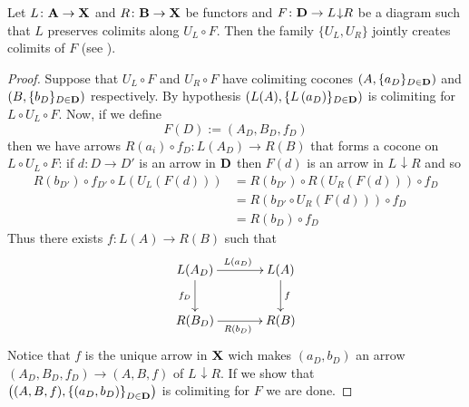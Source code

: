 \documentclass[runningheads,envcountsect]{lipics-v2021}
\def\B{\textbf {\textup{B}}}
\def\D{\textbf {\textup{D}}}
\def\X{\textbf {\textup{X}}}
\def\A{\textbf {\textup{A}}}
\newcommand{\comma}[2]{#1\hspace{1pt} {\downarrow}#2}
\begin{document}
\begin{lemma}\label{colim}
	Let $L\colon \A\to \X$ and $R\colon \B\to \X$ be functors and $F\colon \D\to\comma{L}{R}$ be a diagram such that $L$ preserves colimits along $U_L\circ F$. Then the family $\{U_L, U_R\}$ jointly creates colimits of $F$ (see \cite{castelnovo2023thesis,castelnovo2022newcriterionmathcalmmathcalnadhesivity}).
\end{lemma}
\begin{proof}
	Suppose that $U_L\circ F$ and $U_R\circ F$ have colimiting cocones  $\left(A, \{a_D\}_{D\in \D}\right)$ and $\left(B, \{b_D\}_{D\in \D}\right)$ respectively. By hypothesis $\left(L(A), \{L\left(a_D\right)\}_{D\in \D}\right)$ is colimiting for $L\circ U_L\circ F$. Now, if we define
	\[F(D):=(A_D, B_D, f_D)\]
	then we have arrows $R(a_i)\circ f_D\colon L(A_D)\to R(B)$ that forms a cocone on $L\circ U_L\circ F$: if $d\colon D\to D'$ is an arrow in $\D$ then $F(d)$ is an arrow in $\comma{L}{R}$ and so
	\begin{align*}
		R\left(b_{D'}\right)\circ f_{D'}\circ L(U_L(F(d)))&=R\left(b_{D'}\right)\circ R\left(U_R\left(F(d)\right)\right)\circ f_D\\&=R\left(b_{D'}\circ U_R\left(F(d)\right)\right)\circ f_D\\&=R\left(b_D\right)\circ f_D
	\end{align*}
	Thus there exists $f\colon L(A)\rightarrow R(B)$ such that
	\[\xymatrix@C=35pt{ L(A_D) \ar[r]^{L(a_D)} \ar[d]_{f_D}& L(A) \ar[d]^{f}\\ R(B_D) \ar[r]_{R(b_D)} &R(B)}\]
	Notice that $f$ is the unique arrow in $\X$ wich makes $\left(a_D, b_D\right)$ an arrow $\left(A_D, B_D, f_D\right)\to \left(A, B, f\right)$ of $\comma{L}{R}$. If we show that $\left((A, B, f), \left\{(a_D, b_D)\right\}_{D\in \D}\right)$ is colimiting for $F$ we are done.
	

\end{proof}
\end{document}
